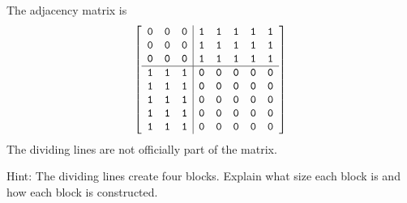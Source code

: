 \subsubsection*{ \answers}
\begin{apart}
    \item The adjacency matrix is
        $$\left[ 
            \begin{array}{ccc|ccccc}
                \texttt{0} & \texttt{0} & \texttt{0} & \texttt{1}& \texttt{1} & \texttt{1} & \texttt{1} & \texttt{1} \\ 
                \texttt{0} & \texttt{0} & \texttt{0} & \texttt{1}& \texttt{1} & \texttt{1} & \texttt{1} & \texttt{1} \\ 
                \texttt{0} & \texttt{0} & \texttt{0} & \texttt{1}& \texttt{1} & \texttt{1} & \texttt{1} & \texttt{1} \\  \hline
                \texttt{1} & \texttt{1} & \texttt{1} & \texttt{0}& \texttt{0} & \texttt{0} & \texttt{0} & \texttt{0} \\ 
                \texttt{1} & \texttt{1} & \texttt{1} & \texttt{0}& \texttt{0} & \texttt{0} & \texttt{0} & \texttt{0} \\
                \texttt{1} & \texttt{1} & \texttt{1} & \texttt{0}& \texttt{0} & \texttt{0} & \texttt{0} & \texttt{0} \\
                \texttt{1} & \texttt{1} & \texttt{1} & \texttt{0}& \texttt{0} & \texttt{0} & \texttt{0} & \texttt{0} \\
                \texttt{1} & \texttt{1} & \texttt{1} & \texttt{0}& \texttt{0} & \texttt{0} & \texttt{0} & \texttt{0} \\
            \end{array}
            \right]$$    
    The dividing lines are not officially part of the matrix.
    \item Hint: The dividing lines create four blocks.  Explain what size each block is and how each block is constructed.
\end{apart}

